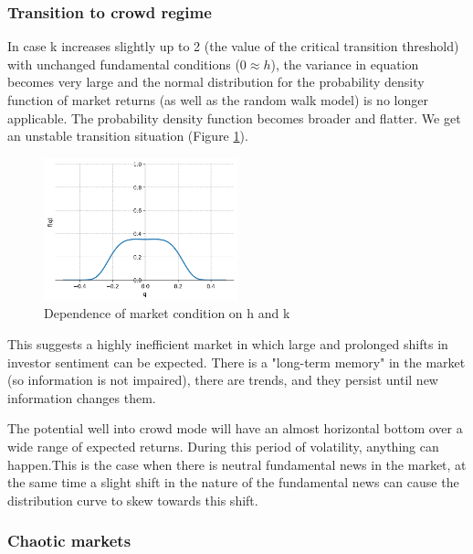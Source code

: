 
\subsubsection*{Transition to crowd regime}

In case k increases slightly up to 2 (the value of the critical transition threshold) with unchanged fundamental conditions ($0 \approx h$), the variance in equation  becomes very large and the normal distribution for the probability density function of market returns (as well as the random walk model) is no longer applicable. The probability density function becomes broader and flatter. We get an unstable transition situation (Figure \ref{fig:transition_market}).

\begin{figure}[h!]
  \includegraphics[width=0.5\textwidth]{figures/transition_market.png}
  \centering
  \caption{Dependence of market condition on h and k}
  \label{fig:transition_market}
\end{figure}

This suggests a highly inefficient market in which large and prolonged shifts in investor sentiment can be expected. There is a "long-term memory" in the market (so information is not impaired), there are trends, and they persist until new information changes them.

The potential well into crowd mode will have an almost horizontal bottom over a wide range of expected returns. During this period of volatility, anything can happen.This is the case when there is neutral fundamental news in the market, at the same time a slight shift in the nature of the fundamental news can cause the distribution curve to skew towards this shift.

\subsubsection*{Chaotic markets}

